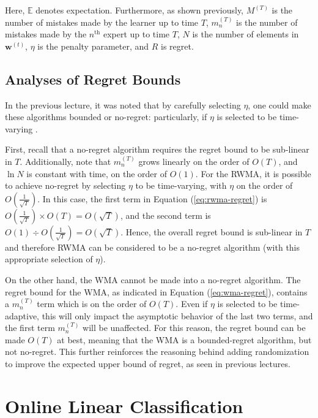 \documentclass[11pt]{article}
\begin{document}
Here, $\mathbb{E}$ denotes expectation. Furthermore, as shown previously, $M^{(T)}$ is the number of mistakes made by the learner up to time $T$, $m_n^{(T)}$ is the number of mistakes made by the $n^{\text{th}}$ expert up to time $T$, $N$  is the number of elements in $\boldsymbol{w}^{(t)}$, $\eta$ is the penalty parameter, and $R$ is regret.  

\subsection{Analyses of Regret Bounds}

In the previous lecture, it was noted that by carefully selecting $\eta$, one could make these algorithms bounded or no-regret: particularly, if $\eta$ is selected to be time-varying \cite{orabona}.

First, recall that a no-regret algorithm requires the regret bound to be sub-linear in $T$. Additionally, note that $m_n^{(T)}$ grows linearly on the order of $O(T)$, and $\ln N$ is constant with time, on the order of $O(1)$. For the RWMA, it is possible to achieve no-regret by selecting $\eta$ to be time-varying, with $\eta$ on the order of $O\left(\frac{1}{\sqrt{T}}\right)$. In this case, the first term in Equation (\ref{eq:rwma-regret}) is $O\left(\frac{1}{\sqrt{T}}\right) \times O(T) = O(\sqrt{T})$, and the second term is $O(1) \div {O\left(\frac{1}{\sqrt{T}}\right)} = O(\sqrt{T})$. Hence, the overall regret bound is sub-linear in $T$ and therefore RWMA can be considered to be a no-regret algorithm (with this appropriate selection of $\eta$).

On the other hand, the WMA cannot be made into a no-regret algorithm. The regret bound for the WMA, as indicated in Equation (\ref{eq:wma-regret}), contains a $m_n^{(T)}$ term which is on the order of $O(T)$. Even if $\eta$ is selected to be time-adaptive, this will only impact the asymptotic behavior of the last two terms, and the first term $m_n^{(T)}$ will be unaffected. For this reason, the regret bound can be made $O(T)$ at best, meaning that the WMA is a bounded-regret algorithm, but not no-regret. This further reinforces the reasoning behind adding randomization to improve the expected upper bound of regret, as seen in previous lectures.

\section{Online Linear Classification}\label{section:linear_classification}
\end{document}
